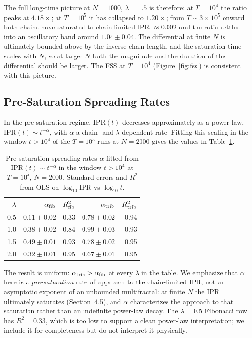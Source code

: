 \documentclass[12pt,a4paper]{article}
\begin{document}
The full long-time picture at $N=1000$, $\lambda=1.5$ is therefore: at
$T=10^4$ the ratio peaks at $4.18\times$; at $T=10^5$ it has collapsed to
$1.20\times$; from $T \sim 3\times10^5$ onward both chains have saturated
to chain-limited IPR $\approx 0.002$ and the ratio settles into an
oscillatory band around $1.04\pm0.04$. The differential at finite $N$ is
ultimately bounded above by the inverse chain length, and the saturation
time scales with $N$, so at larger $N$ both the magnitude and the duration
of the differential should be larger. The FSS at $T=10^4$
(Figure~\ref{fig:fss}) is consistent with this picture.

\subsection{Pre-Saturation Spreading Rates}

In the pre-saturation regime, IPR$(t)$ decreases approximately as a power
law, $\mathrm{IPR}(t) \sim t^{-\alpha}$, with $\alpha$ a chain- and
$\lambda$-dependent rate. Fitting this scaling in the window $t > 10^4$
of the $T=10^5$ runs at $N=2000$ gives the values in
Table~\ref{tab:alpha}.

\begin{table}[h]
\centering
\caption{Pre-saturation spreading rates $\alpha$ fitted from
$\mathrm{IPR}(t) \sim t^{-\alpha}$ in the window $t > 10^4$ at $T=10^5$,
$N=2000$. Standard errors and $R^2$ from OLS on $\log_{10}$IPR vs
$\log_{10}t$.}
\label{tab:alpha}
\begin{tabular}{r r r r r}
\toprule
$\lambda$ & $\alpha_{\rm fib}$ & $R^2_{\rm fib}$ & $\alpha_{\rm trib}$ & $R^2_{\rm trib}$ \\
\midrule
0.5  & $0.11 \pm 0.02$ & 0.33 & $0.78 \pm 0.02$ & 0.94 \\
1.0  & $0.38 \pm 0.02$ & 0.84 & $0.99 \pm 0.03$ & 0.93 \\
1.5  & $0.49 \pm 0.01$ & 0.93 & $0.78 \pm 0.02$ & 0.95 \\
2.0  & $0.32 \pm 0.01$ & 0.95 & $0.67 \pm 0.01$ & 0.95 \\
\bottomrule
\end{tabular}
\end{table}

The result is uniform: $\alpha_{\rm trib} > \alpha_{\rm fib}$ at every
$\lambda$ in the table. We emphasize that $\alpha$ here is a
\emph{pre-saturation} rate of approach to the chain-limited IPR, not an
asymptotic exponent of an unbounded multifractal: at finite $N$ the IPR
ultimately saturates (Section~4.5), and $\alpha$ characterizes the
approach to that saturation rather than an indefinite power-law decay.
The $\lambda=0.5$ Fibonacci row has $R^2=0.33$, which is too low to
support a clean power-law interpretation; we include it for completeness
but do not interpret it physically.
\end{document}
